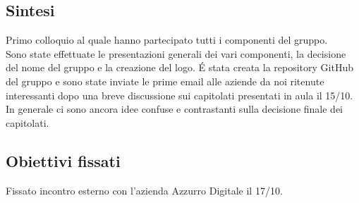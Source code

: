 \documentclass[12pt]{article}
\begin{document}
\subsection{Sintesi}
Primo colloquio al quale hanno partecipato tutti i componenti del gruppo.\\
\vspace{2mm}
Sono state effettuate le presentazioni generali dei vari componenti, la decisione del nome del gruppo e la creazione del logo. \'E stata creata la repository GitHub del gruppo e sono state inviate le prime email alle aziende da noi ritenute interessanti dopo una breve discussione sui capitolati presentati in aula il 15/10. In generale ci sono ancora idee confuse e contrastanti sulla decisione finale dei capitolati. 
\subsection{Obiettivi fissati}
Fissato incontro esterno con l'azienda Azzurro Digitale il 17/10.
\end{document}

